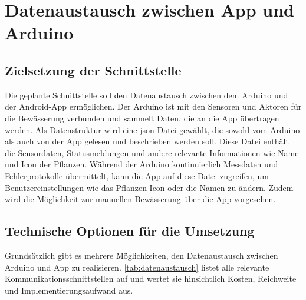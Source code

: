 \chapter{Datenaustausch zwischen App und Arduino}

\section{Zielsetzung der Schnittstelle}
Die geplante Schnittstelle soll den Datenaustausch zwischen dem Arduino und der Android-App ermöglichen. Der Arduino ist mit den Sensoren und Aktoren für die Bewässerung verbunden und sammelt Daten, die an die App übertragen werden. Als Datenstruktur wird eine \ac{json}-Datei gewählt, die sowohl vom Arduino als auch von der App gelesen und beschrieben werden soll. Diese Datei enthält die Sensordaten, Statusmeldungen und andere relevante Informationen wie Name und Icon der Pflanzen. Während der Arduino kontinuierlich Messdaten und Fehlerprotokolle übermittelt, kann die App auf diese Datei zugreifen, um Benutzereinstellungen wie das Pflanzen-Icon oder die Namen zu ändern. Zudem wird die Möglichkeit zur manuellen Bewässerung über die App vorgesehen.

\section{Technische Optionen für die Umsetzung}
Grundsätzlich gibt es mehrere Möglichkeiten, den Datenaustausch zwischen Arduino und App zu realisieren. \autoref{tab:datenaustausch} listet alle relevante Kommunikationsschnittstellen auf und wertet sie hinsichtlich Kosten, Reichweite und Implementierungsaufwand aus.

